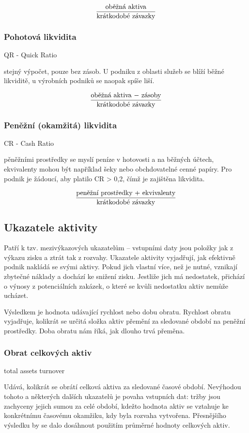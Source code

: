 $$\dfrac{\text{oběžná aktiva}}{\text{krátkodobé závazky}}$$

\subsubsection{Pohotová likvidita} 

QR - Quick Ratio

stejný výpočet, pouze bez zásob. U podniku z oblasti služeb se blíží běžné likviditě, u výrobních podniků se naopak spíše liší.

$$\dfrac{\text{oběžná aktiva $-$ zásoby}}{\text{krátkodobé závazky}}$$

\subsubsection{Peněžní (okamžitá) likvidita}

CR - Cash Ratio

pěněžními prostředky se myslí peníze v hotovosti a na běžných účtech, ekvivalenty mohou být například šeky nebo obchdovatelné cenné papíry. Pro podnik je žádoucí, aby platilo CR > 0,2, čímž je zajištěna likvidita.

$$\dfrac{\text{peněžní prostředky $+$ ekvivalenty}}{\text{krátkodobé závazky}}$$


\subsection{Ukazatele aktivity}
Patří k tzv. mezivýkazových ukazatelům -- vstupními daty jsou položky jak z výkazu zisku a ztrát tak z rozvahy. Ukazatele aktivity vyjadřují, jak efektivně podnik nakládá se svými aktivy. Pokud jich vlastní více, než je nutné, vznikají zbytečné náklady a dochází ke snižení zisku. Jestliže jich má nedostatek, přichází o výnosy z potenciálních zakázek, o které se kvůli nedostatku aktiv nemůže ucházet.

Výsledkem je hodnota udávající rychlost nebo dobu obratu. Rychlost obratu vyjadřuje, kolikrát se určitá složka aktiv přemění za sledované období na peněžní prostředky. Doba obratu nám říká, jak dlouho trvá přeměna.

\subsubsection{Obrat celkových aktiv}

total assets turnover

Udává, kolikrát se obrátí celková aktiva za sledované časové období. Nevýhodou tohoto a některých dalších ukazatelů je povaha vstupních dat: tržby jsou zachyceny jejich sumou za celé období, kdežto hodnota aktiv se vztahuje ke konkrétnímu časovému okamžiku, kdy byla rozvaha vytvořena. Přesnějšího výsledku by se dalo dosáhnout použitím průměrné hodnoty celkových aktiv. 


